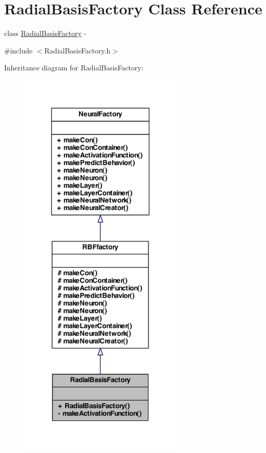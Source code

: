 \hypertarget{class_radial_basis_factory}{
\section{RadialBasisFactory Class Reference}
\label{class_radial_basis_factory}
}


class \hyperlink{class_radial_basis_factory}{RadialBasisFactory} -\/  




{\ttfamily \#include $<$RadialBasisFactory.h$>$}



Inheritance diagram for RadialBasisFactory:\nopagebreak
\begin{figure}[H]
\begin{center}
\leavevmode
\includegraphics[width=222pt]{class_radial_basis_factory__inherit__graph}
\end{center}
\end{figure}


